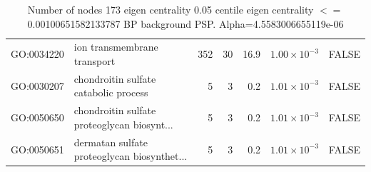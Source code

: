 \begin{table}[ht]
\begin{adjustbox}{max width=\textwidth}
\begin{tabular}{llrrrrl}
  GO:0034220 & ion transmembrane transport & 352 & 30 & 16.9 & $1.00 \times 10^{-3}$ & FALSE \\ 
  GO:0030207 & chondroitin sulfate catabolic process & 5 & 3 & 0.2 & $1.01 \times 10^{-3}$ & FALSE \\ 
  GO:0050650 & chondroitin sulfate proteoglycan biosynt... & 5 & 3 & 0.2 & $1.01 \times 10^{-3}$ & FALSE \\ 
  GO:0050651 & dermatan sulfate proteoglycan biosynthet... & 5 & 3 & 0.2 & $1.01 \times 10^{-3}$ & FALSE \\ 
   \hline
\end{tabular}
\end{adjustbox}
\caption{Number of nodes 173 eigen centrality 0.05 centile  eigen centrality $<=$ 0.00100651582133787 BP background PSP. Alpha=4.5583006655119e-06} 
\label{tab:Number of nodes 173 eigen centrality 0.05 centile  eigen centrality $<=$ 0.00100651582133787 BP background PSP. Alpha=4.5583006655119e-06}
\end{table}


